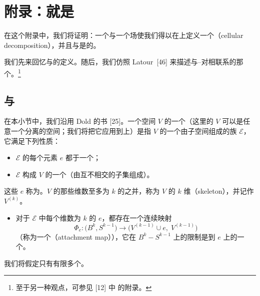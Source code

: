 \section{附录：\trMorseHomology{}就是\trCellularHomology}
\label{sec:cellular-homology}

在这个附录中，我们将证明：一个\trMorseFunction{}与一个\trPseudogradient{}场使我们得以在\trManifold{}上定义一个\textbf{\trCellularDecomposition}（cellular decomposition），并且\trMorseComplex{}与\trCellular\trComplex{}是\trIsomorphic{}的。

我们先来回忆\trCellularDecomposition{}与\trCellular\trComplex{}的定义。随后，我们仿照 Latour~[46] 来描述与\trMorse--\trSmale{}对相联系的那个\trCellularDecomposition。\footnote{至于另一种观点，可参见 [12] 中 \trLaudenbach{}的附录。}

\subsection{\trComplex{}与\trCellularHomology}
\label{subsec:complexes-cellular-homology}

在本小节中，我们沿用 Dold 的书 [25]。一个空间 $V$ 的一个\trCellularDecomposition（这里的 $V$ 可以是任意一个分离的\trTopology{}空间；我们将把它应用到\trCompact{}\trManifold{}上）是指 $V$ 的一个由子空间组成的族 $\mathcal{E}$，它满足下列性质：
\begin{itemize}
\item $\mathcal{E}$ 的每个元素 $e$ 都\trHomeomorphic{}于一个\trOpen{}\trDisk{}；
\item $\mathcal{E}$ 构成 $V$ 的一个\trCovering{}（由互不相交的子集组成）。
\end{itemize}
这些 $e$ 称为\trCellular。$V$ 的那些维数至多为 $k$ 的\trCellular{}之并，称为 $V$ 的 $k$ 维\textbf{\trSkeleton}（skeleton），并记作 $V^{(k)}$。
\begin{itemize}
\item 对于 $\mathcal{E}$ 中每个维数为 $k$ 的 $e$，都存在一个连续映射
\[
\varPhi_e\colon\bigl(B^k,S^{k-1}\bigr)\longrightarrow\bigl(V^{(k-1)}\cup e,\;V^{(k-1)}\bigr)
\]
（称为一个\textbf{\trAttachingMap}（attachment map）），它在 $B^k-S^{k-1}$ 上的限制是到 $e$ 上的一个\trHomeomorphism。
\end{itemize}
我们将假定\trCellular{}只有有限多个。

